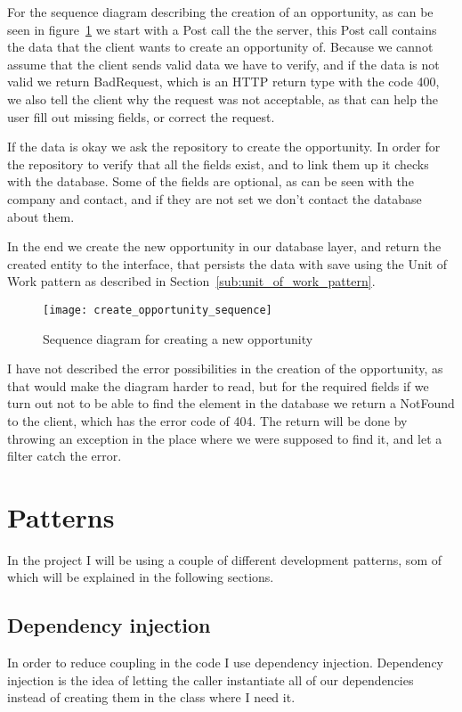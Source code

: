 For the sequence diagram describing the creation of an opportunity, as can be
seen in figure~\ref{fig:opportunity_sequence} we start with a Post call the
the server, this Post call contains the data that the client wants to create an
opportunity of. Because we cannot assume that the client sends valid data we have
to verify, and if the data is not valid we return BadRequest, which is an HTTP
return type with the code 400, we also tell the client why the request was not
acceptable, as that can help the user fill out missing fields, or correct the
request. 

If the data is okay we ask the repository to create the opportunity. In order
for the repository to verify that all the fields exist, and to link them up it
checks with the database. Some of the fields are optional, as can be seen with
the company and contact, and if they are not set we don't contact the database
about them.

In the end we create the new opportunity in our database layer, and return the
created entity to the interface, that persists the data with save using the Unit
of Work pattern as described in Section~\ref{sub:unit_of_work_pattern}.

\begin{figure}[!htb]
  \centering
  \texttt{[image: create\_opportunity\_sequence]}
  \caption{Sequence diagram for creating a new opportunity}
\label{fig:opportunity_sequence}
\end{figure}

I have not described the error possibilities in the creation of the opportunity,
as that would make the diagram harder to read, but for the required fields if we
turn out not to be able to find the element in the database we return a NotFound
to the client, which has the error code of 404. The return will be done by
throwing an exception in the place where we were supposed to find it, and let a
filter catch the error.

\section{Patterns}
\label{sec:Patterns}
In the project I will be using a couple of different development patterns, som
of which will be explained in the following sections.

\subsection{Dependency injection}
\label{sub:dependency_injection}
In order to reduce coupling in the code I use dependency injection.
Dependency injection is the idea of letting the caller instantiate all of our
dependencies instead of creating them in the class where I need it. 

